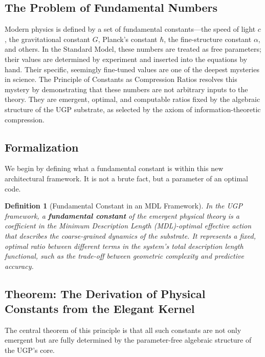 \documentclass[12pt]{article}
\newtheorem{definition}[theorem]{Definition}
\begin{document}
\subsection{The Problem of Fundamental Numbers}
Modern physics is defined by a set of fundamental constants—the speed of light $c$, the gravitational constant $G$, Planck's constant $\hbar$, the fine-structure constant $\alpha$, and others. In the Standard Model, these numbers are treated as free parameters; their values are determined by experiment and inserted into the equations by hand. Their specific, seemingly fine-tuned values are one of the deepest mysteries in science. The Principle of Constants as Compression Ratios resolves this mystery by demonstrating that these numbers are not arbitrary inputs to the theory. They are emergent, optimal, and computable ratios fixed by the algebraic structure of the UGP substrate, as selected by the axiom of information-theoretic compression.

\subsection{Formalization}
We begin by defining what a fundamental constant is within this new architectural framework. It is not a brute fact, but a parameter of an optimal code.

\begin{definition}[Fundamental Constant in an MDL Framework]
\label{def:fundamental_constant}
In the UGP framework, a \textbf{fundamental constant} of the emergent physical theory is a coefficient in the Minimum Description Length (MDL)-optimal effective action that describes the coarse-grained dynamics of the substrate. It represents a fixed, optimal ratio between different terms in the system's total description length functional, such as the trade-off between geometric complexity and predictive accuracy.
\end{definition}

\subsection{Theorem: The Derivation of Physical Constants from the Elegant Kernel}
The central theorem of this principle is that all such constants are not only emergent but are fully determined by the parameter-free algebraic structure of the UGP's core.
\end{document}
